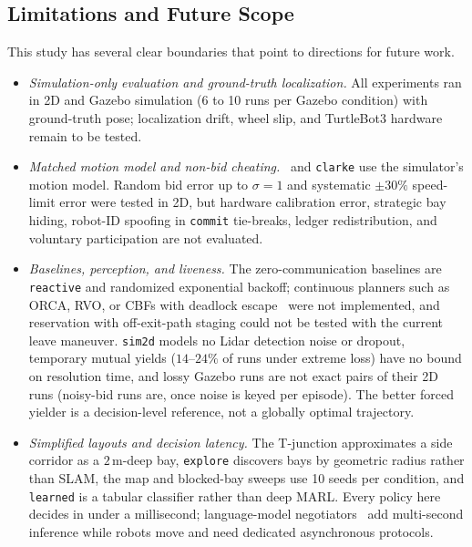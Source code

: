 \subsection{Limitations and Future Scope}
This study has several clear boundaries that point to directions for future work.
\begin{itemize}
\item \emph{Simulation-only evaluation and ground-truth localization.} All experiments ran in 2D and Gazebo simulation (6 to 10 runs per Gazebo condition) with ground-truth pose; localization drift, wheel slip, and TurtleBot3 hardware remain to be tested.
\item \emph{Matched motion model and non-bid cheating.} \cb\ and \texttt{clarke} use the simulator's motion model. Random bid error up to $\sigma=1$ and systematic $\pm30\%$ speed-limit error were tested in 2D, but hardware calibration error, strategic bay hiding, robot-ID spoofing in \texttt{commit} tie-breaks, ledger redistribution, and voluntary participation are not evaluated.
\item \emph{Baselines, perception, and liveness.} The zero-communication baselines are \texttt{reactive} and randomized exponential backoff; continuous planners such as ORCA, RVO, or CBFs with deadlock escape~\cite{zheng2023deadlock} were not implemented, and reservation with off-exit-path staging could not be tested with the current leave maneuver. \texttt{sim2d} models no Lidar detection noise or dropout, temporary mutual yields ($14$--$24\%$ of runs under extreme loss) have no bound on resolution time, and lossy Gazebo runs are not exact pairs of their 2D runs (noisy-bid runs are, once noise is keyed per episode). The better forced yielder is a decision-level reference, not a globally optimal trajectory.
\item \emph{Simplified layouts and decision latency.} The T-junction approximates a side corridor as a $2$\,m-deep bay, \texttt{explore} discovers bays by geometric radius rather than SLAM, the map and blocked-bay sweeps use 10 seeds per condition, and \texttt{learned} is a tabular classifier rather than deep MARL. Every policy here decides in under a millisecond; language-model negotiators~\cite{marlin2024,gamechat2025,garg2024llm} add multi-second inference while robots move and need dedicated asynchronous protocols.
\end{itemize}

